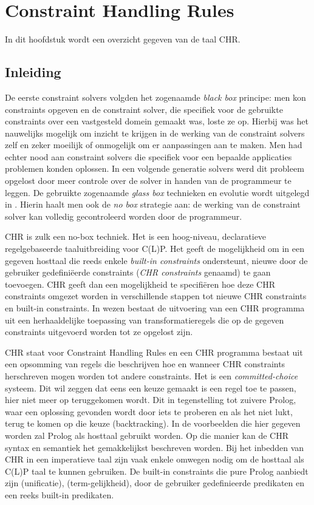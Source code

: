 \chapter{Constraint Handling Rules} \label{chap:chr}

In dit hoofdstuk wordt een overzicht gegeven van de taal CHR.

\section{Inleiding}

De eerste constraint solvers volgden het zogenaamde {\em black box} principe: men kon constraints opgeven en de constraint solver, die specifiek voor de gebruikte constraints over een vastgesteld domein gemaakt was, loste ze op. Hierbij was het nauwelijks mogelijk om inzicht te krijgen in de werking van de constraint solvers zelf en zeker moeilijk of onmogelijk om er aanpassingen aan te maken. Men had echter nood aan constraint solvers die specifiek voor een bepaalde applicaties problemen konden oplossen. In een volgende generatie solvers werd dit probleem opgelost door meer controle over de solver in handen van de programmeur te leggen. De gebruikte zogenaamde  {\em glass box} technieken en evolutie wordt uitgelegd in \cite{chr}. Hierin haalt men ook de {\em no box} strategie aan: de werking van de constraint solver kan volledig gecontroleerd worden door de programmeur.

CHR is zulk een no-box techniek. Het is een hoog-niveau, declaratieve regelgebaseerde taaluitbreiding voor C(L)P. Het geeft de mogelijkheid om in een gegeven hosttaal die reeds enkele {\em built-in constraints} ondersteunt, nieuwe door de gebruiker gedefini\"eerde constraints ({\em CHR constraints} genaamd) te gaan toevoegen. CHR geeft dan een mogelijkheid te specifi\"eren hoe deze CHR constraints omgezet worden in verschillende stappen tot nieuwe CHR constraints en built-in constraints. In wezen bestaat de uitvoering van een CHR programma uit een herhaaldelijke toepassing van transformatieregels die op de gegeven constraints uitgevoerd worden tot ze opgelost zijn.

CHR staat voor Constraint Handling Rules en een CHR programma bestaat uit een opsomming van regels die beschrijven hoe en wanneer CHR constraints herschreven mogen worden tot andere constraints. Het is een {\em committed-choice} systeem. Dit wil zeggen dat eens een keuze gemaakt is een regel toe te passen, hier niet meer op teruggekomen wordt. Dit in tegenstelling tot zuivere Prolog, waar een oplossing gevonden wordt door iets te proberen en als het niet lukt, terug te komen op die keuze (backtracking). In de voorbeelden die hier gegeven worden zal Prolog als hosttaal gebruikt worden. Op die manier kan de CHR syntax en semantiek het gemakkelijkst beschreven worden. Bij het inbedden van CHR in een imperatieve taal zijn vaak enkele omwegen nodig om de hosttaal als C(L)P taal te kunnen gebruiken. De built-in constraints die pure Prolog aanbiedt zijn \code{=} (unificatie), \code{==} (term-gelijkheid), door de gebruiker gedefinieerde predikaten en een reeks built-in predikaten.

